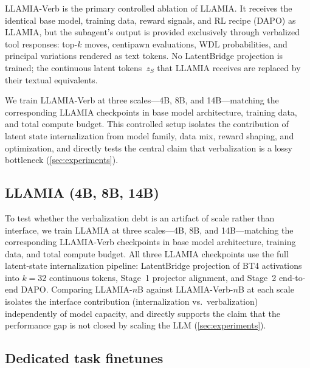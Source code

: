 LLAMIA-Verb is the primary controlled ablation of LLAMIA.
It receives the identical base model, training data, reward signals, and RL
recipe (DAPO) as LLAMIA, but the subagent's output is provided exclusively
through verbalized tool responses: top-$k$ moves, centipawn evaluations, WDL
probabilities, and principal variations rendered as text tokens.
No LatentBridge projection is trained; the continuous latent
tokens~$z_S$ that LLAMIA receives are replaced by their textual equivalents.

We train LLAMIA-Verb at three scales---4B, 8B, and 14B---matching the
corresponding LLAMIA checkpoints in base model architecture, training data,
and total compute budget.
This controlled setup isolates the contribution of latent state
internalization from model family, data mix, reward shaping, and
optimization, and directly tests the central claim that verbalization is a
lossy bottleneck (\cref{sec:experiments}).

\subsection{LLAMIA (4B, 8B, 14B)}
\label{sec:app_baseline_llamia_scale}

To test whether the verbalization debt is an artifact of scale rather than interface, we train LLAMIA at three scales---4B, 8B, and 14B---matching the corresponding LLAMIA-Verb checkpoints in base model architecture, training data, and total compute budget.
All three LLAMIA checkpoints use the full latent-state internalization pipeline: LatentBridge projection of BT4 activations into $k{=}32$ continuous tokens, Stage~1 projector alignment, and Stage~2 end-to-end DAPO.
Comparing LLAMIA-$n$B against LLAMIA-Verb-$n$B at each scale isolates the interface contribution (internalization vs.\ verbalization) independently of model capacity, and directly supports the claim that the performance gap is not closed by scaling the LLM (\cref{sec:experiments}).

\subsection{Dedicated task finetunes}
\label{sec:app_baseline_experts}


